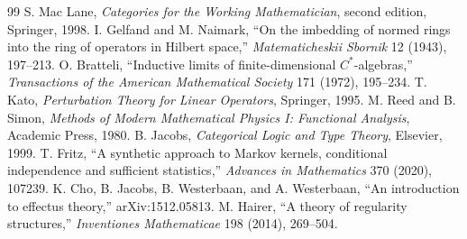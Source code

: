 \documentclass[11pt,oneside]{book}
\theoremstyle{remark}
\begin{document}
\begin{thebibliography}{99}
 S. Mac Lane, \emph{Categories for the Working Mathematician}, second edition, Springer, 1998.
 I. Gelfand and M. Naimark, ``On the imbedding of normed rings into the ring of operators in Hilbert space,'' \emph{Matematicheskii Sbornik} 12 (1943), 197--213.
 O. Bratteli, ``Inductive limits of finite-dimensional $C^*$-algebras,'' \emph{Transactions of the American Mathematical Society} 171 (1972), 195--234.
 T. Kato, \emph{Perturbation Theory for Linear Operators}, Springer, 1995.
 M. Reed and B. Simon, \emph{Methods of Modern Mathematical Physics I: Functional Analysis}, Academic Press, 1980.
 B. Jacobs, \emph{Categorical Logic and Type Theory}, Elsevier, 1999.
 T. Fritz, ``A synthetic approach to Markov kernels, conditional independence and sufficient statistics,'' \emph{Advances in Mathematics} 370 (2020), 107239.
 K. Cho, B. Jacobs, B. Westerbaan, and A. Westerbaan, ``An introduction to effectus theory,'' arXiv:1512.05813.
 M. Hairer, ``A theory of regularity structures,'' \emph{Inventiones Mathematicae} 198 (2014), 269--504.
\end{thebibliography}
\end{document}
